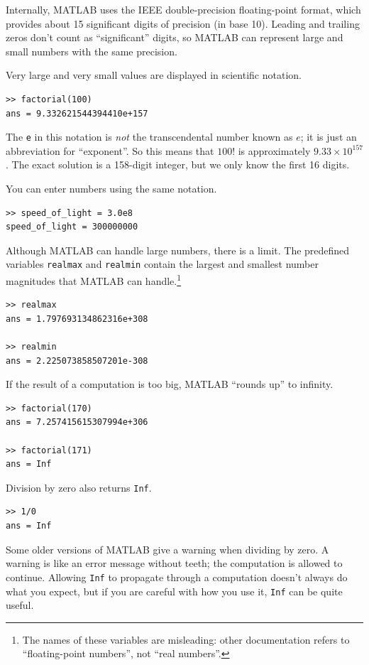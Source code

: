 \documentclass{book}
\begin{document}
Internally, MATLAB uses the IEEE double-precision floating-point
format, which provides about 15 significant digits of precision (in
base 10).  Leading and trailing zeros don't count as ``significant''
digits, so MATLAB can represent large and small numbers
with the same precision.

Very large and very small values are displayed in scientific notation.

\begin{verbatim}
>> factorial(100)
ans = 9.332621544394410e+157
\end{verbatim}

The {\tt e} in this notation is {\em not} the transcendental number
known as $e$; it is just an abbreviation for ``exponent''.  So
this means that $100!$ is approximately $9.33 \times 10^{157}$.  The
exact solution is a 158-digit integer, but we only know the first 16
digits.

You can enter numbers using the same notation.

\begin{verbatim}
>> speed_of_light = 3.0e8
speed_of_light = 300000000
\end{verbatim}

Although MATLAB can handle large numbers, there is a limit.  The
predefined variables {\tt realmax} and {\tt realmin} contain the
largest and smallest number magnitudes that MATLAB can
handle.\footnote{The names of these variables are misleading: other
documentation refers to ``floating-point numbers'', not ``real
numbers''.}

\begin{verbatim}
>> realmax
ans = 1.797693134862316e+308

>> realmin
ans = 2.225073858507201e-308
\end{verbatim}

If the result of a computation is too big, MATLAB ``rounds up''
to infinity.

\begin{verbatim}
>> factorial(170)
ans = 7.257415615307994e+306

>> factorial(171)
ans = Inf
\end{verbatim}

Division by zero also returns {\tt Inf}.

\begin{verbatim}
>> 1/0
ans = Inf
\end{verbatim}

Some older versions of MATLAB give a warning when dividing by zero.
A warning is like an error message without teeth; the computation
is allowed to continue.  Allowing {\tt Inf} to propagate
through a computation doesn't always do what you expect, but if you
are careful with how you use it, {\tt Inf} can be quite useful.
\end{document}
